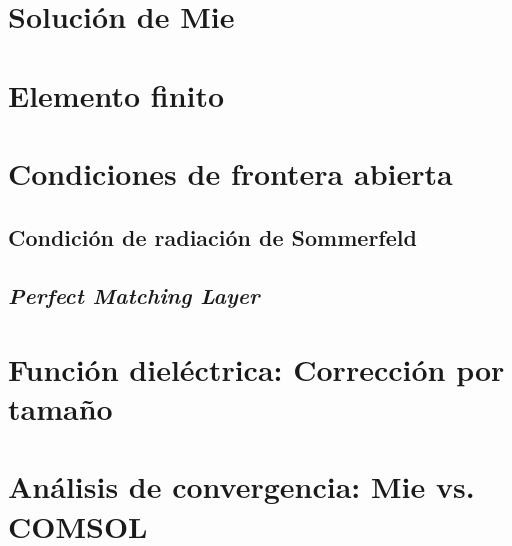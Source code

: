 \documentclass[spanish,8pt,aspectratio=169,xcolor=table]{beamer}
\begin{document}
\section{Solución de Mie}
    
\section{Elemento finito}
    
\section{Condiciones de frontera abierta}
    \subsection{Condición de radiación de Sommerfeld}
        
    \subsection{\textit{Perfect Matching Layer}}
        
\section{Función dieléctrica: Corrección por tamaño}
    
\section{Análisis de convergencia: Mie vs. COMSOL}
    
\end{document}
